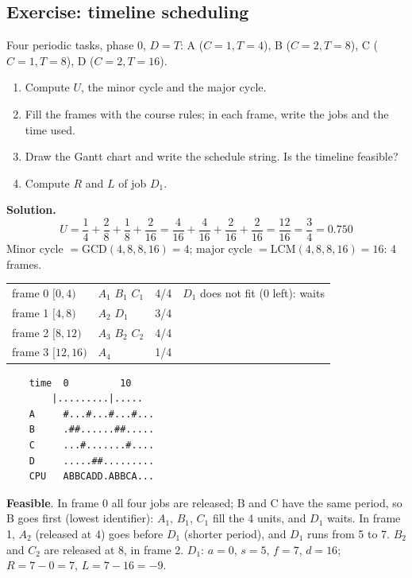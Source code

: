 \subsection{Exercise: timeline scheduling}
Four periodic tasks, phase 0, $D = T$: A ($C = 1, T = 4$), B ($C = 2, T = 8$), C ($C = 1, T = 8$), D ($C = 2, T = 16$).
\begin{enumerate}
    \item Compute $U$, the minor cycle and the major cycle.
    \item Fill the frames with the course rules; in each frame, write the jobs and the time used.
    \item Draw the Gantt chart and write the schedule string. Is the timeline feasible?
    \item Compute $R$ and $L$ of job $D_1$.
\end{enumerate}

\textbf{Solution.}
\[
U = \frac{1}{4} + \frac{2}{8} + \frac{1}{8} + \frac{2}{16} = \frac{4}{16} + \frac{4}{16} + \frac{2}{16} + \frac{2}{16} = \frac{12}{16} = \frac{3}{4} = 0.750
\]
Minor cycle $= \mathrm{GCD}(4, 8, 8, 16) = 4$; major cycle $= \mathrm{LCM}(4, 8, 8, 16) = 16$: 4 frames.
\begin{center}
    \begin{tabular}{l l l l}
        \hline
        frame 0 $[0,4)$ & $A_1$ $B_1$ $C_1$ & 4/4 & $D_1$ does not fit (0 left): waits \\
        frame 1 $[4,8)$ & $A_2$ $D_1$ & 3/4 & \\
        frame 2 $[8,12)$ & $A_3$ $B_2$ $C_2$ & 4/4 & \\
        frame 3 $[12,16)$ & $A_4$ & 1/4 & \\
        \hline
    \end{tabular}
\end{center}
\begin{verbatim}
    time  0         10
        |.........|.....
    A     #...#...#...#...
    B     .##......##.....
    C     ...#.......#....
    D     .....##.........
    CPU   ABBCADD.ABBCA...
\end{verbatim}
\textbf{Feasible}. In frame 0 all four jobs are released; B and C have the same period, so B goes first (lowest identifier): $A_1$, $B_1$, $C_1$ fill the 4 units, and $D_1$ waits. In frame 1, $A_2$ (released at 4) goes before $D_1$ (shorter period), and $D_1$ runs from 5 to 7. $B_2$ and $C_2$ are released at 8, in frame 2. $D_1$: $a = 0$, $s = 5$, $f = 7$, $d = 16$; \quad $R = 7 - 0 = 7$, \quad $L = 7 - 16 = -9$.

